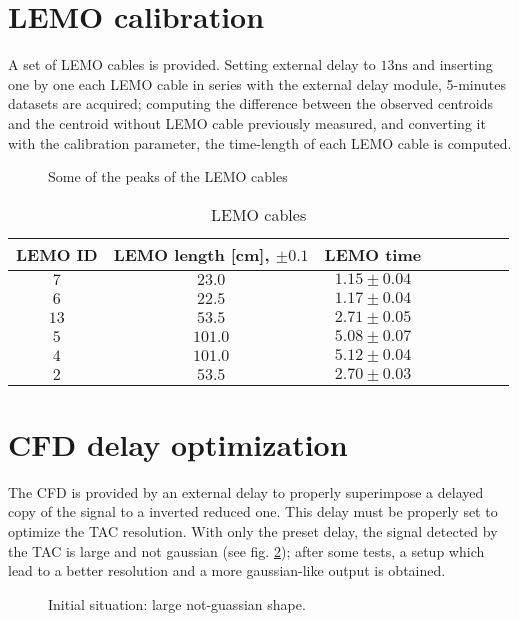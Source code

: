 \documentclass[11pt,a4 paper]{article}
\begin{document}
\section{LEMO calibration}
A set of LEMO cables is provided. Setting external delay to $13\si{\nano\second}$ and inserting one by one each LEMO cable in series with the external delay module, 5-minutes datasets are acquired; computing the difference between the observed centroids and the centroid without LEMO cable previously measured, and converting it with the calibration parameter, the time-length of each LEMO cable is computed.

\begin{figure}[H]
    \centering
    \caption{Some of the peaks of the LEMO cables}
    \label{fig:lemo}
\end{figure}

\begin{table}[H]
    \centering
    \begin{tabular}{cccccccc}
        \toprule
        LEMO ID & LEMO length [cm], $\pm 0.1$ & LEMO time \\
        \midrule
        $7$ & $23.0$ & $1.15\pm0.04$\\
        $6$ & $22.5$ & $1.17\pm0.04$\\
        $13$ & $53.5$ & $2.71\pm0.05$\\
        $5$ & $101.0$ & $5.08\pm0.07$\\
        $4$ & $101.0$ & $5.12\pm0.04$\\
        $2$ & $53.5$ & $2.70\pm0.03$\\
        \bottomrule
    \end{tabular}
    \caption{LEMO cables}
    \label{tab:lemo}
\end{table}

\section{CFD delay optimization}

The CFD is provided by an external delay to properly superimpose a delayed copy of the signal to a inverted reduced one. This delay must be properly set to optimize the TAC resolution. With only the preset delay, the signal detected by the TAC is large and not gaussian (see fig. \ref{fig:delay:bad}); after some tests, a setup which lead to a better resolution and a more gaussian-like output is obtained.

\begin{figure}[H]
    \centering
    \caption{Initial situation: large not-guassian shape.}
    \label{fig:delay:bad}
\end{figure}
\end{document}
